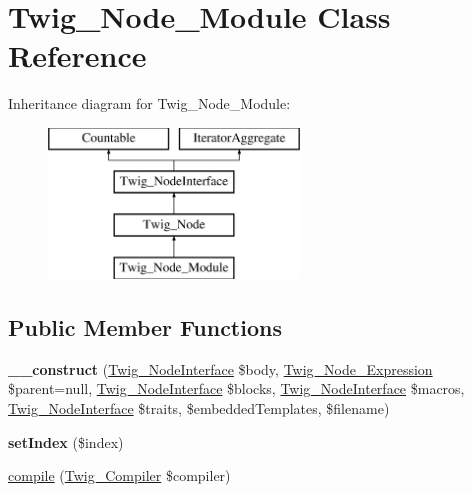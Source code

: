 \hypertarget{class_twig___node___module}{}\section{Twig\+\_\+\+Node\+\_\+\+Module Class Reference}
\label{class_twig___node___module}
Inheritance diagram for Twig\+\_\+\+Node\+\_\+\+Module\+:\begin{figure}[H]
\begin{center}
\leavevmode
\includegraphics[height=4.000000cm]{class_twig___node___module}
\end{center}
\end{figure}
\subsection*{Public Member Functions}
\begin{DoxyCompactItemize}
\item 
\hypertarget{class_twig___node___module_a12208720e82e5d73ba02162300bf4dd9}{}{\bfseries \+\_\+\+\_\+construct} (\hyperlink{interface_twig___node_interface}{Twig\+\_\+\+Node\+Interface} \$body, \hyperlink{class_twig___node___expression}{Twig\+\_\+\+Node\+\_\+\+Expression} \$parent=null, \hyperlink{interface_twig___node_interface}{Twig\+\_\+\+Node\+Interface} \$blocks, \hyperlink{interface_twig___node_interface}{Twig\+\_\+\+Node\+Interface} \$macros, \hyperlink{interface_twig___node_interface}{Twig\+\_\+\+Node\+Interface} \$traits, \$embedded\+Templates, \$filename)\label{class_twig___node___module_a12208720e82e5d73ba02162300bf4dd9}

\item 
\hypertarget{class_twig___node___module_ae0d7cd73f8a39406c10dfa943609ebc6}{}{\bfseries set\+Index} (\$index)\label{class_twig___node___module_ae0d7cd73f8a39406c10dfa943609ebc6}

\item 
\hyperlink{class_twig___node___module_a4e0faa87c3fae583620b84d3607085da}{compile} (\hyperlink{class_twig___compiler}{Twig\+\_\+\+Compiler} \$compiler)
\end{DoxyCompactItemize}
